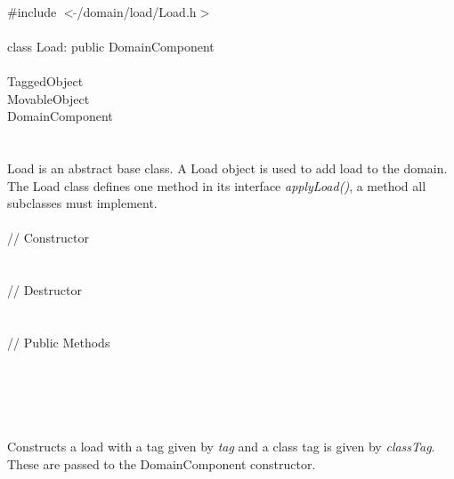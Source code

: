
   \\
\indent \#include $<\tilde{ }$/domain/load/Load.h$>$  \\

  \\
\indent class Load: public DomainComponent  \\

 \\
\indent TaggedObject \\
\indent MovableObject \\
\indent\indent DomainComponent \\
\indent\indent{} \\

  \\
\indent Load is an abstract base class. A Load object is used to add
load to the domain. The Load class defines one method in its interface
{\em applyLoad()}, a method all subclasses must implement. \\


  \\
\indent // Constructor  \\
  \\ \\
\indent // Destructor  \\
 \\ \\
\indent // Public Methods   \\
 \\
\\
\\

  \\
  \\
Constructs a load with a tag given by {\em tag} and a class tag is
given by {\em classTag}. These are passed to the DomainComponent constructor. \\

  \\
 \\

